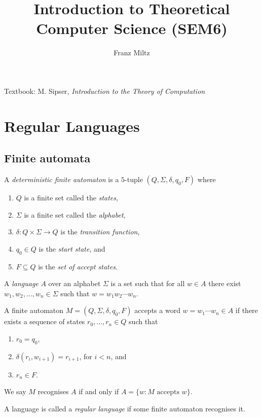 \documentclass{article}
\title{Introduction to Theoretical Computer Science (SEM6)}
\author{Franz Miltz}
\begin{document}
\maketitle
\noindent Textbook: M. Sipser, \emph{Introduction to the Theory of Computation}
\tableofcontents
\pagebreak

\section{Regular Languages}

\subsection{Finite automata}

\begin{definition}
	A \emph{deterministic finite automaton} is a $5$-tuple $(Q,\Sigma,\delta,q_0,F)$ where
	\begin{enumerate}
		\item $Q$ is a finite set called the \emph{states},
		\item $\Sigma$ is a finite set called the \emph{alphabet},
		\item $\delta:Q\times\Sigma\to Q$ is the \emph{transition function},
		\item $q_0\in Q$ is the \emph{start state}, and
		\item $F\subseteq Q$ is the \emph{set of accept states}.
	\end{enumerate}
\end{definition}

\begin{definition}
	A \emph{language} $A$ over an alphabet $\Sigma$ is a set such that for all
	$w\in A$ there exist $w_1,w_2,...,w_n\in\Sigma$ such that $w=w_1w_2\cdots w_n$.

	A finite automaton $M=(Q,\Sigma,\delta,q_0,F)$ accepts a word $w=w_1\cdots w_n\in A$
	if there exists a sequence of states $r_0,...,r_n\in Q$ such that
	\begin{enumerate}
		\item $r_0=q_0$,
		\item $\delta(r_i,w_{i+1})=r_{i+1}$, for $i<n$, and
		\item $r_n\in F$.
	\end{enumerate}
	We say $M$ recognises $A$ if and only if $A=\{w : M\text{ accepts }w\}$.
\end{definition}

\begin{definition}[Sipser p. 40]
	A language is called a \emph{regular language} if some finite automaton recognises it.
\end{definition}
\end{document}
